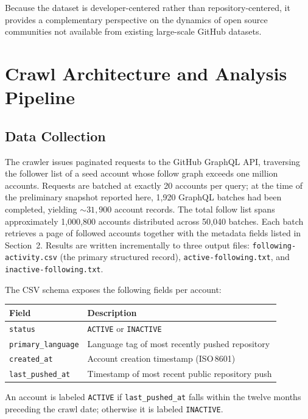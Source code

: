 \documentclass[12pt,a4paper]{article}
\begin{document}
Because the dataset is developer-centered rather than repository-centered, it
provides a complementary perspective on the dynamics of open source communities
not available from existing large-scale GitHub datasets.

\section{Crawl Architecture and Analysis Pipeline}

\subsection{Data Collection}

The crawler issues paginated requests to the GitHub GraphQL API, traversing the
follower list of a seed account whose follow graph exceeds one million accounts.
Requests are batched at exactly 20 accounts per query; at the time of the
preliminary snapshot reported here, 1,920 GraphQL batches had been completed,
yielding $\sim31{,}900$ account records. The total follow list spans
approximately 1,000,800 accounts distributed across 50,040 batches. Each batch
retrieves a page of followed accounts together with the metadata fields listed in
Section~2. Results are written incrementally to three output files:
\texttt{following-activity.csv} (the primary structured record),
\texttt{active-following.txt}, and \texttt{inactive-following.txt}.

The CSV schema exposes the following fields per account:

\begin{center}
\begin{tabular}{ll}
\toprule
Field & Description \\
\midrule
\texttt{status}           & \texttt{ACTIVE} or \texttt{INACTIVE} \\
\texttt{primary\_language} & Language tag of most recently pushed repository \\
\texttt{created\_at}      & Account creation timestamp (ISO\,8601) \\
\texttt{last\_pushed\_at} & Timestamp of most recent public repository push \\
\bottomrule
\end{tabular}
\end{center}

An account is labeled \texttt{ACTIVE} if \texttt{last\_pushed\_at} falls within
the twelve months preceding the crawl date; otherwise it is labeled
\texttt{INACTIVE}.
\end{document}
